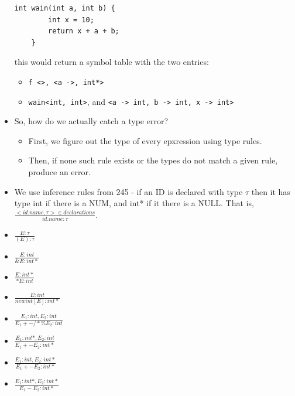 \documentclass[12pt]{article}
\begin{document}
\begin{itemize}
\begin{lstlisting}[mathescape, numbers=none, breaklines=true]
    int wain(int a, int b) {
        int x = 10;
        return x + a + b;
    }
        \end{lstlisting}
    this would return a symbol table with the two entries:
    \begin{itemize}
        \item \lstinline[mathescape]{f <>, <a ->, int*>}
        \item \lstinline[mathescape]{wain<int, int>}, and \lstinline[mathescape]{<a -> int, b -> int, x -> int>}
    \end{itemize}
    \item So, how do we actually catch a type error?
        \begin{itemize}
            \item First, we figure out the type of every epxression using type rules.
            \item Then, if none such rule exists or the types do not match a given rule, produce an error.
        \end{itemize} 
    \item We use inference rules from 245 - if an ID is declared with type $\tau$ then it has type int if there is a NUM, and int* if it there is a NULL.  That is, $\frac{<id.name, \tau> \in declarations}{id.name : \tau}$.
    \item $\frac{E: \tau}{(E) : \tau}$
    \item $\frac{E: int}{\&E: int*}$
    \item $\frac{E: int*}{*E: int}$
    \item $\frac{E: int}{new int [E]: int*}$
    \item $\frac{E_1: int, E_2: int}{E_1 +-/*\% E_2: int}$
    \item $\frac{E_1: int*, E_2: int}{E_1 +- E_2: int*}$
    \item $\frac{E_1: int, E_2: int*}{E_1 +- E_2: int*}$
    \item $\frac{E_1: int*, E_2: int*}{E_1 - E_2: int*}$
\end{itemize}
\end{document}
